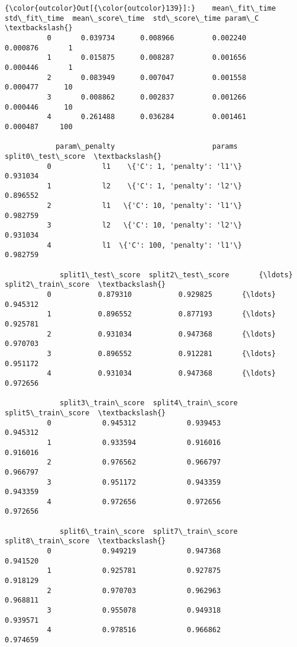 \documentclass[11pt]{article}
\begin{document}
\begin{Verbatim}[commandchars=\\\{\}]
{\color{outcolor}Out[{\color{outcolor}139}]:}    mean\_fit\_time  std\_fit\_time  mean\_score\_time  std\_score\_time param\_C  \textbackslash{}
          0       0.039734      0.008966         0.002240        0.000876       1   
          1       0.015875      0.008287         0.001656        0.000446       1   
          2       0.083949      0.007047         0.001558        0.000477      10   
          3       0.008862      0.002837         0.001266        0.000446      10   
          4       0.261488      0.036284         0.001461        0.000487     100   
          
            param\_penalty                       params  split0\_test\_score  \textbackslash{}
          0            l1    \{'C': 1, 'penalty': 'l1'\}           0.931034   
          1            l2    \{'C': 1, 'penalty': 'l2'\}           0.896552   
          2            l1   \{'C': 10, 'penalty': 'l1'\}           0.982759   
          3            l2   \{'C': 10, 'penalty': 'l2'\}           0.931034   
          4            l1  \{'C': 100, 'penalty': 'l1'\}           0.982759   
          
             split1\_test\_score  split2\_test\_score       {\ldots}         split2\_train\_score  \textbackslash{}
          0           0.879310           0.929825       {\ldots}                   0.945312   
          1           0.896552           0.877193       {\ldots}                   0.925781   
          2           0.931034           0.947368       {\ldots}                   0.970703   
          3           0.896552           0.912281       {\ldots}                   0.951172   
          4           0.931034           0.947368       {\ldots}                   0.972656   
          
             split3\_train\_score  split4\_train\_score  split5\_train\_score  \textbackslash{}
          0            0.945312            0.939453            0.945312   
          1            0.933594            0.916016            0.916016   
          2            0.976562            0.966797            0.966797   
          3            0.951172            0.943359            0.943359   
          4            0.972656            0.972656            0.972656   
          
             split6\_train\_score  split7\_train\_score  split8\_train\_score  \textbackslash{}
          0            0.949219            0.947368            0.941520   
          1            0.925781            0.927875            0.918129   
          2            0.970703            0.962963            0.968811   
          3            0.955078            0.949318            0.939571   
          4            0.978516            0.966862            0.974659   
          

\end{Verbatim}
\end{document}
